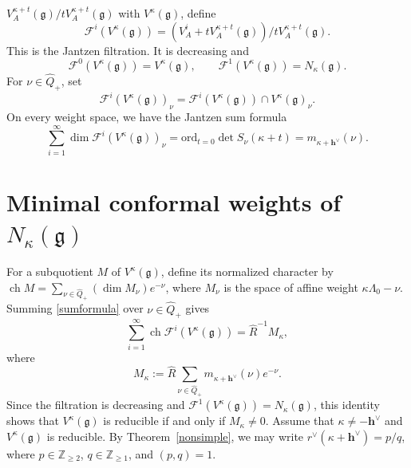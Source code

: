 \documentclass[11pt,a4paper]{amsart}
\newcommand{\ZZ}{\mathbb Z}
\theoremstyle{plain}
\numberwithin{equation}{section}
\begin{document}
$V_A^{\kappa+t}(\mathfrak g)/t
V_A^{\kappa+t}(\mathfrak g)$ with $V^\kappa(\mathfrak g)$, define
\[
\mathcal F^i(V^\kappa(\mathfrak g))
=(V_A^i+t V_A^{\kappa+t}(\mathfrak g))/
t V_A^{\kappa+t}(\mathfrak g).
\]
This is the Jantzen filtration. It is decreasing  and
\[
\mathcal F^0(V^\kappa(\mathfrak g))=V^\kappa(\mathfrak g),
\qquad
\mathcal F^1(V^\kappa(\mathfrak g))=N_\kappa(\mathfrak g).
\]
For $\nu\in\widehat Q_+$, set
\[
\mathcal F^i(V^\kappa(\mathfrak g))_\nu
=\mathcal F^i(V^\kappa(\mathfrak g))
\cap V^\kappa(\mathfrak g)_\nu.
\]
On every weight space, we have the Jantzen sum formula
\cite{GK07,Jan77}
\begin{equation}\label{sumformula}
\sum_{i=1}^{\infty}
\dim\mathcal F^i(V^\kappa(\mathfrak g))_\nu
=
\mathrm{ord}_{t=0}\det S_\nu(\kappa+t)
=m_{\kappa+\mathbf{h}^\vee}(\nu).
\end{equation}

\section{\texorpdfstring{Minimal conformal weights of
$N_{\kappa}(\mathfrak g)$}{Minimal conformal weight of the maximal submodule}}
\label{sec:minimal-weight}
For a subquotient \(M\) of \(V^\kappa(\mathfrak g)\), define its
normalized character by
\(\operatorname{ch}M
=\sum_{\nu\in\widehat Q_+}(\dim M_\nu)e^{-\nu}\),
where \(M_\nu\) is the space of affine weight
\(\kappa\Lambda_0-\nu\).
Summing \eqref{sumformula} over \(\nu\in\widehat Q_+\) gives
\[
\sum_{i=1}^{\infty}
\operatorname{ch}\mathcal F^i(V^\kappa(\mathfrak g))
=\widehat R^{-1}M_\kappa,
\]
where
\[
M_\kappa
:=\widehat R\sum_{\nu\in\widehat Q_+}
m_{\kappa+\mathbf{h}^\vee}(\nu)e^{-\nu}.
\]
Since the filtration is decreasing and
\(\mathcal F^1(V^\kappa(\mathfrak g))=N_\kappa(\mathfrak g)\),
this identity shows that \(V^\kappa(\mathfrak g)\) is reducible
if and only if \(M_\kappa\ne0\).
Assume that \(\kappa\ne-\mathbf{h}^\vee\) and
\(V^\kappa(\mathfrak g)\) is reducible.
By Theorem~\ref{nonsimple}, we may write
\(r^\vee(\kappa+\mathbf{h}^\vee)=p/q\), where
\(p\in\ZZ_{\ge2}\), \(q\in\ZZ_{\ge1}\), and \((p,q)=1\).
\end{document}
